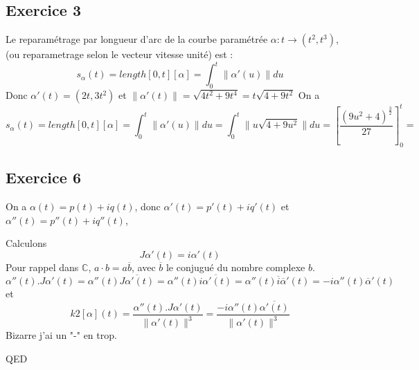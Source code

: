 \documentclass[]{book}
\theoremstyle{definition}
\newcommand{\bb}[1]{\mathbb{#1}}
\newcommand{\C}{\bb{C}}
\begin{document}
\subsection*{Exercice 3}
Le reparam\'etrage par longueur d'arc de la courbe param\'etr\'ee $\alpha : t \to (t^2, t^3)$, (ou reparametrage selon le vecteur vitesse unit\'e) est :
$$
s_{\alpha}(t) = length[0,t][\alpha] = \int_0^t \lVert \alpha'(u) \rVert du
$$ 
Donc $\alpha'(t) = (2t, 3t^2)$ et $\lVert \alpha'(t) \rVert = \sqrt{4t^2+9t^4} = t\sqrt{4+9t^2}$
On a
$$
s_{\alpha}(t) = length[0,t][\alpha] = \int_0^t \lVert \alpha'(u) \rVert du = \int_0^t \lVert u\sqrt{4+9u^2} \rVert du = \left[ \frac{(9u^2+4)^{\frac{3}{2}}}{27}\right]_0^t = 
$$





\subsection*{Exercice 6}
On a  $\alpha(t) = p(t) + iq(t)$, donc $\alpha'(t) = p'(t) + iq'(t)$ et $\alpha''(t) = p''(t) + iq''(t)$,

Calculons
$$
J\alpha'(t) = i\alpha'(t)
$$
Pour rappel dans $\C$, $a \cdot b = a \overline{b}$, avec $\overline{b}$ le conjugu\'e du nombre complexe $b$.
$$
\alpha''(t).J\alpha'(t) = \alpha''(t)\overline{J\alpha'(t)} = \alpha''(t)\overline{i\alpha'(t)} = \alpha''(t)\overline{i}\overline{\alpha}'(t) = -i\alpha''(t)\overline{\alpha}'(t)  
$$
et 
$$
k2[\alpha](t) = \frac{\alpha''(t).J\alpha'(t)}{\lVert \alpha'(t) \rVert^3} = \frac{-i\alpha''(t)\overline{\alpha'(t)}}{\lVert \alpha'(t) \rVert^3}
$$
Bizarre j'ai un "-" en trop.

QED
\end{document}

